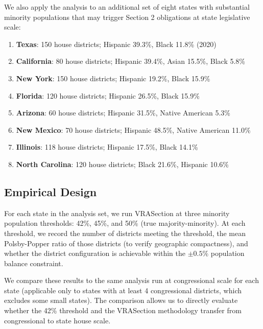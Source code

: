 We also apply the analysis to an additional set of eight states with substantial minority populations that may trigger Section 2 obligations at state legislative scale:

\begin{enumerate}
\item \textbf{Texas}: 150 house districts; Hispanic 39.3\%, Black 11.8\% (2020)
\item \textbf{California}: 80 house districts; Hispanic 39.4\%, Asian 15.5\%, Black 5.8\%
\item \textbf{New York}: 150 house districts; Hispanic 19.2\%, Black 15.9\%
\item \textbf{Florida}: 120 house districts; Hispanic 26.5\%, Black 15.9\%
\item \textbf{Arizona}: 60 house districts; Hispanic 31.5\%, Native American 5.3\%
\item \textbf{New Mexico}: 70 house districts; Hispanic 48.5\%, Native American 11.0\%
\item \textbf{Illinois}: 118 house districts; Hispanic 17.5\%, Black 14.1\%
\item \textbf{North Carolina}: 120 house districts; Black 21.6\%, Hispanic 10.6\%
\end{enumerate}

\subsection{Empirical Design}

For each state in the analysis set, we run VRASection at three minority population thresholds: 42\%, 45\%, and 50\% (true majority-minority). At each threshold, we record the number of districts meeting the threshold, the mean Polsby-Popper ratio of those districts (to verify geographic compactness), and whether the district configuration is achievable within the $\pm 0.5\%$ population balance constraint.

We compare these results to the same analysis run at congressional scale for each state (applicable only to states with at least 4 congressional districts, which excludes some small states). The comparison allows us to directly evaluate whether the 42\% threshold and the VRASection methodology transfer from congressional to state house scale.
